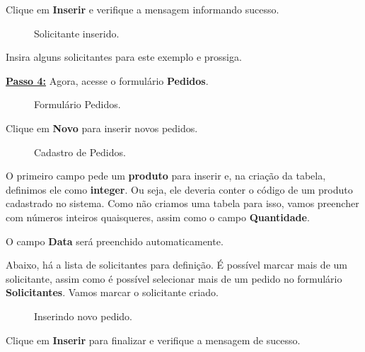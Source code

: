 \documentclass[9pt]{report}
\begin{document}
{       Clique em \textbf{Inserir} e verifique a mensagem informando
       sucesso.
       
       \begin{figure}[H]
        \caption{Solicitante inserido.}
        \label{fig:formssolictinsert}
       \end{figure}

       Insira alguns solicitantes para este exemplo e prossiga.

       
       \underline{\textbf{Passo 4:}} Agora, acesse o formulário \textbf{Pedidos}.
       
       \begin{figure}[H]
        \caption{Formulário Pedidos.}
        \label{fig:formspedido}
       \end{figure}

       Clique em \textbf{Novo} para inserir novos pedidos.

       \begin{figure}[H]
        \caption{Cadastro de  Pedidos.}
        \label{fig:formscadastropedido}
       \end{figure}

       O primeiro campo pede um \textbf{produto} para inserir e, na
       criação da tabela, definimos ele como \textbf{integer}. Ou
       seja, ele deveria conter o código de um produto cadastrado no
       sistema. Como não criamos uma tabela para isso, vamos
       preencher com números inteiros quaisqueres, assim como o campo
       \textbf{Quantidade}.

       O campo \textbf{Data} será preenchido automaticamente.

       Abaixo, há a lista de solicitantes para definição. É possível
       marcar mais de um solicitante, assim como é possível
       selecionar mais de um pedido no formulário
       \textbf{Solicitantes}. Vamos marcar o solicitante criado.

       \begin{figure}[H]
        \caption{Inserindo novo pedido.}
        \label{fig:formsinsertpedido}
       \end{figure}

       Clique em \textbf{Inserir} para finalizar e verifique a
       mensagem de sucesso.

}
\end{document}
